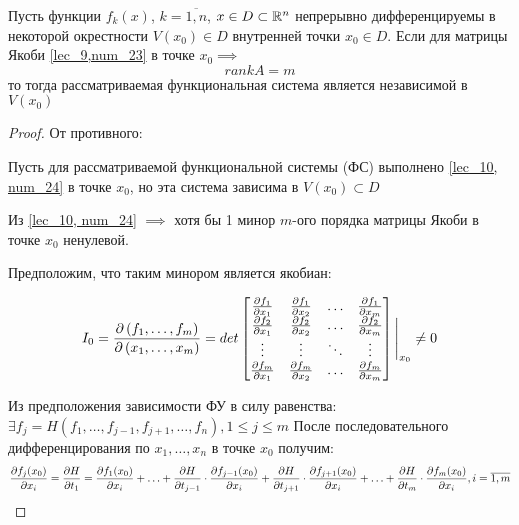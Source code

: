\documentclass[../../main.tex]{subfiles}
\begin{document}
\begin{thm}
		
	Пусть функции $f_k\left(x\right)$, $k = \overline{1,n}$,
	$x \in D \subset \mathbb{R}^n$ непрерывно дифференцируемы в некоторой 
	окрестности $V(x_0) \in D$ внутренней точки $x_0 \in D$. Если 
	для матрицы Якоби \ref{lec_9,num_23} в точке $x_0 \implies$ 
	\begin{equation} \label{lec_10, num_24}
		rankA = m
	\end{equation}
 	то тогда рассматриваемая функциональная система 
 	является независимой в $V(x_0)$ 
 	
\end{thm}

\begin{proof}
	От противного:
	
	Пусть для рассматриваемой функциональной системы (ФС) 
	выполнено \ref{lec_10, num_24} в точке $x_0$, но эта система 
	зависима в $V(x_0) \subset D$
	
	Из \ref{lec_10, num_24} $\implies$ хотя бы 1 минор $m$-ого 
	порядка матрицы Якоби в точке $x_0$ ненулевой.
	
	Предположим, что таким минором является якобиан:
	
	\begin{equation} \label{lec_10, num_25}
		I_0 = \frac{\partial \left( f_1, \ldots, f_m \right)}{\partial  \left(x_1, 
		\ldots, x_m \right) } = det 
		\begin{bmatrix}
		\frac{\partial f_1}{\partial x_1} & \frac{\partial f_1}{\partial x_2} & \ldots & \frac{\partial f_1}{\partial x_m} \\
		\frac{\partial f_2}{\partial x_1} & \frac{\partial f_2}{\partial x_2} & \ldots & \frac{\partial f_2}{\partial x_m}\\
		\vdots & \vdots & \ddots & \vdots \\
		\frac{\partial f_m}{\partial x_1} & \frac{\partial f_m}{\partial x_2} & \ldots & \frac{\partial f_m}{\partial x_m}
		\end{bmatrix} \Bigg|_{x_0}
		\neq 0
	\end{equation} 
	
	Из предположения зависимости ФУ в силу равенства:
	$\exists f_j = H\left( f_1, \ldots, f_{j-1}, f_{j+1}, \ldots, 
	f_n\right), 1 \le j \le m$
	После последовательного дифференцирования по $x_1, \ldots, 
	x_n$ в точке $x_0$ получим:
	\begin{equation} \label{lec_10, num26}
		\frac{\partial f_j(x_0)}{\partial x_i} = \frac{\partial H}{\partial t_1} =
		\frac{\partial f_1(x_0)}{\partial x_i} + \ldots + \frac{\partial H}{\partial  t_{j-1} } \cdot
		\frac{\partial  f_{j-1}(x_0) }{\partial x_i} + \frac{\partial H}{\partial  t_{j+1} } \cdot
		\frac{\partial  f_{j+1}(x_0) }{\partial x_i} + \ldots + \frac{\partial H}{\partial t_m} \cdot
	    \frac{\partial  f_m(x_0) }{\partial x_i}, i = \overline{1, m}
	\end{equation}
	

\end{proof}
\end{document}
